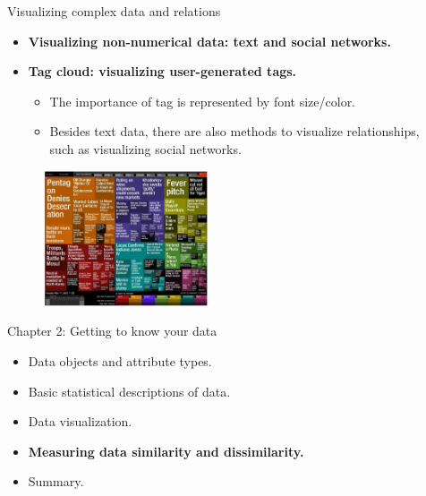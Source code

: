 \documentclass[aspectratio=169,t]{beamer}
\begin{document}
  { 
    \begin{frame}{Visualizing complex data and relations}
    \centering
    \begin{itemize}
      \item \textbf{Visualizing non-numerical data: text and social networks.}
      \item \textbf{Tag cloud: visualizing user-generated tags.}
      \begin{itemize}
        \item The importance of tag is represented by font size/color.
        \item Besides text data, there are also methods to visualize relationships, \\ such as visualizing social networks.
      \end{itemize}
    \end{itemize}
    \includegraphics[width=7cm,height=4cm]{img/google_news.png}
    \end{frame}
  }

  { 
    \begin{frame}{Chapter 2: Getting to know your data}
    \centering
    \begin{itemize}
        \item Data objects and attribute types.
        \item Basic statistical descriptions of data.
        \item Data visualization.
        \item \textbf{Measuring data similarity and dissimilarity.}
        \item Summary.
    \end{itemize}
    \end{frame}
  }
\end{document}
